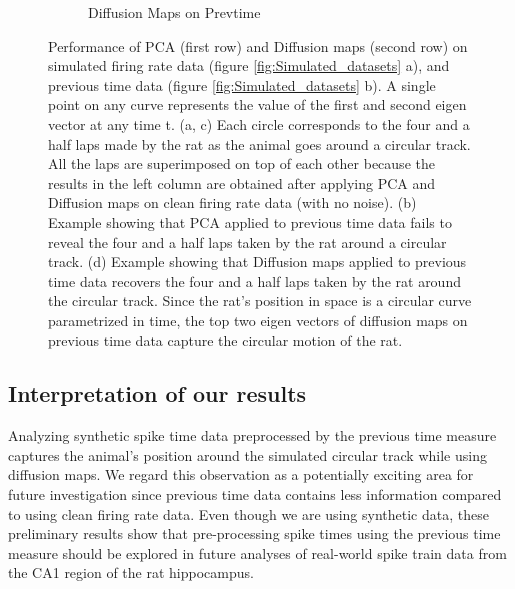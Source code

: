 \begin{figure}
\begin{subfigure}[b]{0.475\textwidth}
            \caption[]%
            {{\small Diffusion Maps on Prevtime}}  
            \label{fig:Diffusion maps on Prevtime in 3D }
        \end{subfigure}
        \caption[]%
         {\small Performance of PCA (first row) and Diffusion maps (second row) on simulated firing rate data (figure \ref{fig:Simulated_datasets} a),  and  previous  time data (figure \ref{fig:Simulated_datasets} b).
 A single point on any curve  represents the value of the first and second eigen vector at any time t.
(a, c) Each circle  corresponds to the four and a half laps made by the rat as the animal goes around a circular track. All the laps are superimposed on top of each other because the results in the left column are obtained after applying PCA  and Diffusion maps on clean firing rate data (with no noise). 
(b) Example showing that PCA applied to previous time data fails to reveal the four and a half laps taken by the rat around a circular track. 
(d)  Example showing that  Diffusion maps applied to previous time data recovers the four and a half laps taken by the rat around the circular  track. Since the rat's position in space is a circular curve parametrized in time, the top
         two eigen vectors of diffusion maps on previous time data capture the circular motion of the rat.} 
        \label{fig:DiffMaps_PCA_on_Prevtime_FR}
\end{figure}



\subsection{Interpretation of our results}
Analyzing synthetic spike time data preprocessed by the previous time measure captures the animal's position around the simulated circular track while using diffusion maps. We regard this observation as a potentially exciting area for future investigation since previous time data contains less information compared to using clean firing rate data. Even though we are using  synthetic data, these preliminary results show that pre-processing spike times using the previous time  measure should be explored in future analyses of real-world spike train data from the CA1 region of the rat hippocampus. 









